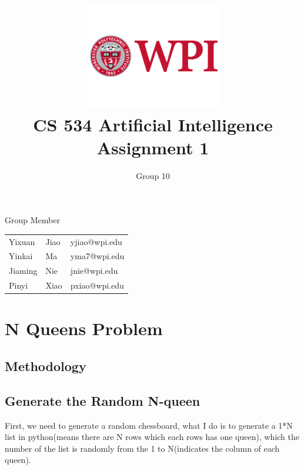 \documentclass[11pt, a4paper]{article}
\title{\includegraphics[width=0.45\textwidth]{wpi2}
        \\CS 534 Artificial Intelligence \\ Assignment 1 }          %
\author{Group 10 }                    %
\begin{document}
\begin{titlepage}
	
\maketitle
{} %

\begin{center}
Group Member
\end{center}

\begin{table}[htbp] 
\begin{center}
\begin{tabular}{l l l} 
	 
	 Yixuan & Jiao  &   yjiao@wpi.edu \\
     Yinkai & Ma  &   yma7@wpi.edu \\
     Jiaming & Nie  &  jnie@wpi.edu \\
     Pinyi & Xiao  &  pxiao@wpi.edu \\
\end{tabular}
\end{center}
\end{table}



\thispagestyle{empty}  %

\end{titlepage}

\tableofcontents

\newpage

\section{N Queens Problem}

\subsection{Methodology}

\subsection{Generate the Random N-queen}

First, we need to generate a random chessboard, what I do is to generate a 1*N list in python(means there are N rows which each rows has one queen), which the number of the list is randomly from the 1 to N(indicates the column of each queen). 
\end{document}
